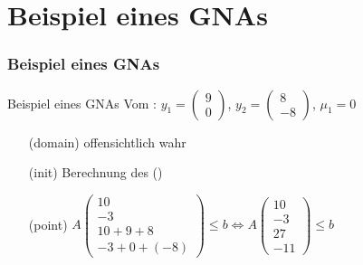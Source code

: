 \section{Beispiel  eines GNAs}
\frame{\tableofcontents[currentsection]}
\begin{frame}
	\frametitle{\color{white}Beispiel  eines GNAs}
	\begin{exampleblock}{Beispiel eines GNAs }
		Vom \solver: $y_1=\begin{pmatrix} 9 \\ 0 \end{pmatrix}$, $y_2=\begin{pmatrix} 8 \\ -8 \end{pmatrix}$, $\mu_1=0$\newline
		\vspace*{-.8em}
		\begin{itemize}
			\setlength{\itemindent}{1.5cm}
			\item[(domain)] offensichtlich wahr \checkmark
			\item[(init)] Berechnung des \stem (\checkmark)
			\item[(point)]  $A\begin{pmatrix} 10 \\ -3 \\ 10+9+8 \\ -3 + 0 + (-8) \end{pmatrix} \le b \Leftrightarrow A\begin{pmatrix} 10 \\ -3 \\ 27 \\ -11 \end{pmatrix} \le b$ \checkmark
		\end{itemize}
	\end{exampleblock}
\end{frame}

